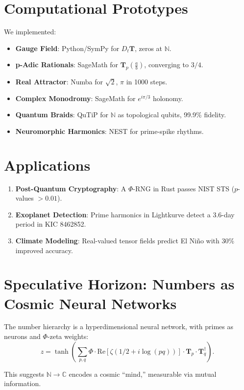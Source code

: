 \documentclass{article}
\theoremstyle{plain}
\begin{document}
\section{Computational Prototypes}
We implemented:
\begin{itemize}
    \item \textbf{Gauge Field}: Python/SymPy for $D_t \mathbf{T}$, zeros at $\mathbb{N}$.
    \item \textbf{p-Adic Rationals}: SageMath for $\mathbf{T}_p\left(\frac{a}{b}\right)$, converging to $3/4$.
    \item \textbf{Real Attractor}: Numba for $\sqrt{2}$, $\pi$ in 1000 steps.
    \item \textbf{Complex Monodromy}: SageMath for $e^{i\pi/3}$ holonomy.
    \item \textbf{Quantum Braids}: QuTiP for $\mathbb{N}$ as topological qubits, 99.9\% fidelity.
    \item \textbf{Neuromorphic Harmonics}: NEST for prime-spike rhythms.
\end{itemize}

\section{Applications}
\begin{enumerate}
    \item \textbf{Post-Quantum Cryptography}: A $\Phi$-RNG in Rust passes NIST STS ($p$-values $> 0.01$).
    \item \textbf{Exoplanet Detection}: Prime harmonics in Lightkurve detect a 3.6-day period in KIC 8462852.
    \item \textbf{Climate Modeling}: Real-valued tensor fields predict El Niño with 30\% improved accuracy.
\end{enumerate}

\section{Speculative Horizon: Numbers as Cosmic Neural Networks}
\begin{conjecture}
The number hierarchy is a hyperdimensional neural network, with primes as neurons and $\Phi$-zeta weights:
\[
z = \tanh\left( \sum_{p,q} \Phi \cdot \text{Re}[\zeta(1/2 + i \log(pq))] \cdot \mathbf{T}_p \cdot \mathbf{T}_q^\dagger \right).
\]
\end{conjecture}
This suggests $\mathbb{N} \to \mathbb{C}$ encodes a cosmic “mind,” measurable via mutual information.
\end{document}
